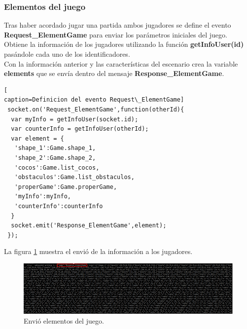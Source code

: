 \subsubsection{Elementos del juego}
Tras haber acordado jugar una partida ambos jugadores se define el evento \textbf{Request\_ElementGame} para enviar los parámetros iniciales del juego.
\\Obtiene la información de los jugadores utilizando la función \textbf{getInfoUser(id)} pasándole cada uno de los identificadores.
\\Con la información anterior y las características del escenario crea la variable \textbf{elements} que se envía dentro del mensaje \textbf{Response\_ElementGame}.
\begin{lstlisting}[
caption=Definicion del evento Request\_ElementGame]
 socket.on('Request_ElementGame',function(otherId){
  var myInfo = getInfoUser(socket.id);
  var counterInfo = getInfoUser(otherId);
  var element = {
   'shape_1':Game.shape_1,
   'shape_2':Game.shape_2,
   'cocos':Game.list_cocos,
   'obstaculos':Game.list_obstaculos,
   'properGame':Game.properGame,
   'myInfo':myInfo,
   'counterInfo':counterInfo
  }
  socket.emit('Response_ElementGame',element);
 });
\end{lstlisting}
La figura \ref{fig:Response_elementGame} muestra el envió de la información a los jugadores.
\begin{figure}[!h]
\begin{center}
  \includegraphics[width=0.9\linewidth]{Figures/Response_elementGame}
	\decoRule
	\caption[Envió elementos del juego.]{Envió elementos del juego.}
\label{fig:Response_elementGame}
\end{center}
\end{figure}
